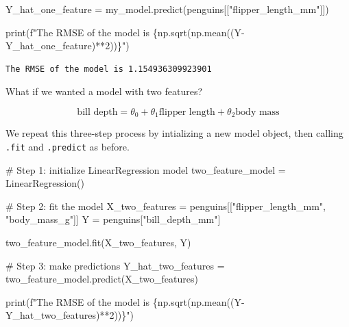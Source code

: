 \documentclass[
  letterpaper,
  DIV=11,
  numbers=noendperiod]{scrreprt}
\newenvironment{Shaded}{\begin{snugshade}}{\end{snugshade}}
\newcommand{\BuiltInTok}[1]{\textcolor[rgb]{0.00,0.23,0.31}{#1}}
\newcommand{\CommentTok}[1]{\textcolor[rgb]{0.37,0.37,0.37}{#1}}
\newcommand{\DecValTok}[1]{\textcolor[rgb]{0.68,0.00,0.00}{#1}}
\newcommand{\NormalTok}[1]{\textcolor[rgb]{0.00,0.23,0.31}{#1}}
\newcommand{\OperatorTok}[1]{\textcolor[rgb]{0.37,0.37,0.37}{#1}}
\newcommand{\SpecialCharTok}[1]{\textcolor[rgb]{0.37,0.37,0.37}{#1}}
\newcommand{\SpecialStringTok}[1]{\textcolor[rgb]{0.13,0.47,0.30}{#1}}
\newcommand{\StringTok}[1]{\textcolor[rgb]{0.13,0.47,0.30}{#1}}
\begin{document}
\begin{Shaded}
\begin{Highlighting}[]
\NormalTok{Y\_hat\_one\_feature }\OperatorTok{=}\NormalTok{ my\_model.predict(penguins[[}\StringTok{"flipper\_length\_mm"}\NormalTok{]])}

\BuiltInTok{print}\NormalTok{(}\SpecialStringTok{f"The RMSE of the model is }\SpecialCharTok{\{}\NormalTok{np}\SpecialCharTok{.}\NormalTok{sqrt(np.mean((Y}\OperatorTok{{-}}\NormalTok{Y\_hat\_one\_feature)}\OperatorTok{**}\DecValTok{2}\NormalTok{))}\SpecialCharTok{\}}\SpecialStringTok{"}\NormalTok{)}
\end{Highlighting}
\end{Shaded}

\begin{verbatim}
The RMSE of the model is 1.154936309923901
\end{verbatim}

What if we wanted a model with two features?

\[\text{bill depth} = \theta_0 + \theta_1 \text{flipper length} + \theta_2 \text{body mass}\]

We repeat this three-step process by intializing a new model object,
then calling \texttt{.fit} and \texttt{.predict} as before.

\begin{Shaded}
\begin{Highlighting}[]
\CommentTok{\# Step 1: initialize LinearRegression model}
\NormalTok{two\_feature\_model }\OperatorTok{=}\NormalTok{ LinearRegression()}

\CommentTok{\# Step 2: fit the model}
\NormalTok{X\_two\_features }\OperatorTok{=}\NormalTok{ penguins[[}\StringTok{"flipper\_length\_mm"}\NormalTok{, }\StringTok{"body\_mass\_g"}\NormalTok{]]}
\NormalTok{Y }\OperatorTok{=}\NormalTok{ penguins[}\StringTok{"bill\_depth\_mm"}\NormalTok{]}

\NormalTok{two\_feature\_model.fit(X\_two\_features, Y)}

\CommentTok{\# Step 3: make predictions}
\NormalTok{Y\_hat\_two\_features }\OperatorTok{=}\NormalTok{ two\_feature\_model.predict(X\_two\_features)}

\BuiltInTok{print}\NormalTok{(}\SpecialStringTok{f"The RMSE of the model is }\SpecialCharTok{\{}\NormalTok{np}\SpecialCharTok{.}\NormalTok{sqrt(np.mean((Y}\OperatorTok{{-}}\NormalTok{Y\_hat\_two\_features)}\OperatorTok{**}\DecValTok{2}\NormalTok{))}\SpecialCharTok{\}}\SpecialStringTok{"}\NormalTok{)}
\end{Highlighting}
\end{Shaded}
\end{document}
